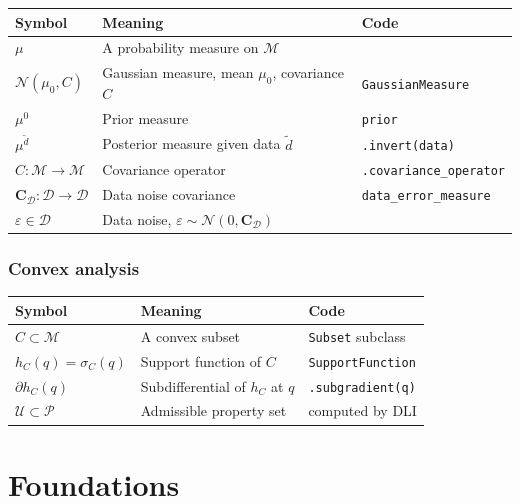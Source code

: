 \documentclass[11pt,twoside,openright]{book}
\theoremstyle{plain}
\theoremstyle{definition}
\theoremstyle{remark}
\newcommand{\modelspace}{\mathcal{M}}
\newcommand{\dataspace}{\mathcal{D}}
\begin{document}
\begin{longtable}{lll}
\toprule
Symbol & Meaning & Code \\
\midrule
$\mu$ & A probability measure on $\modelspace$ & \\
$\mathcal{N}(\mu_0, C)$ & Gaussian measure, mean $\mu_0$, covariance $C$ & \texttt{GaussianMeasure} \\
$\mu^0$ & Prior measure & \texttt{prior} \\
$\mu^{\tilde{d}}$ & Posterior measure given data $\tilde{d}$ & \texttt{.invert(data)} \\
$C : \modelspace \to \modelspace$ & Covariance operator & \texttt{.covariance\_operator} \\
$\mathbf{C}_{\dataspace} : \dataspace \to \dataspace$ & Data noise covariance & \texttt{data\_error\_measure} \\
$\varepsilon \in \dataspace$ & Data noise, $\varepsilon \sim \mathcal{N}(0,\mathbf{C}_{\dataspace})$ & \\
\bottomrule
\end{longtable}

\section*{Convex analysis}

\begin{longtable}{lll}
\toprule
Symbol & Meaning & Code \\
\midrule
$C \subset \modelspace$ & A convex subset & \texttt{Subset} subclass \\
$h_C(q) = \sigma_C(q)$ & Support function of $C$ & \texttt{SupportFunction} \\
$\partial h_C(q)$ & Subdifferential of $h_C$ at $q$ & \texttt{.subgradient(q)} \\
$\mathcal{U} \subset \mathcal{P}$ & Admissible property set & computed by DLI \\
\bottomrule
\end{longtable}

\mainmatter

\part{Foundations}
\label{part:foundations}
\end{document}
